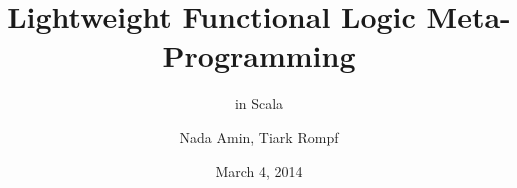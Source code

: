 \documentclass{beamer}
\title{Lightweight Functional Logic Meta-Programming}
\subtitle{in Scala}
\author{Nada Amin, Tiark Rompf}
\institute{LAMP, EPFL}
\date{March 4, 2014}
\begin{document}
\frame{\titlepage}
\end{document}
